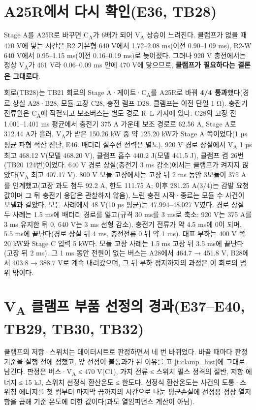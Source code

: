 \section{A25R에서 다시 확인(E36, TB28)}

Stage A를 A25R로 바꾸면 C\textsubscript{A}가 6배가 되어 V\textsubscript{A} 상승이 느려진다. 클램프가 없을 때 470 V에 닿는 시간은 R2 기본형 640 V에서 1.72–2.08 ms(이전 0.90–1.09 ms), R2-W 640 V에서 0.95–1.15 ms(이전 0.16–0.19 ms)로 늦어졌다. 그러나 920 V 충전에서는 정상 V\textsubscript{A}가 461 V라 0.06–0.09 ms 안에 470 V에 닿으므로, \textbf{클램프가 필요하다는 결론은 그대로다}.

회로(TB28)는 TB21 회로의 Stage A·게이트·C\textsubscript{A}를 A25R로 바꿔 \textbf{4/4 통과}했다(경로 상실 A28·B28, 모듈 고장 C28, 충전 램프 D28. 클램프는 이전 단일 1 Ω). 충전기 전류원은 C\textsubscript{A}에 직결되고 보조버스는 별도 경로 R–L 가지에 있다. C28의 고장 전 1.001–1.401 ms 평균에서 충전기 375 A 가운데 보조 경로로 62.56 A, Stage A로 312.44 A가 흘러, V\textsubscript{A}가 받은 150.26 kW 중 약 125.20 kW가 Stage A 쪽이었다(1 µs 평균 파형 적산 진단, E46. 배터리 실수전 전력은 별도). 920 V 경로 상실에서 V\textsubscript{A} 1 µs 최고 468.12 V(모델 468.20 V), 클램프 흡수 440.2 J(모델 441.5 J), 클램프 켬 26번(TB20 124번)이었다. 640 V 경로 상실(충전기 3 ms 감소)에서는 클램프가 켜지지 않았다(V\textsubscript{A} 최고 407.17 V). 800 V 모듈 고장에서는 고장 뒤 2 ms 동안 3모듈이 375 A를 인계했고(고장 과도 첨두 92.2 A, 한도 111.75 A; 이후 281.25 A(3/4)는 감발 요청값이며 그 뒤 충전기 응답은 관찰하지 않음), 느린 충전 시작·종료는 모듈 수 사건이 모델과 같았다. 모든 사례에서 48 V(10 µs 평균)는 47.994–48.027 V였다. 경로 상실 두 사례는 1.5 ms에 배터리 경로를 잃고(규격 30 ms를 3 ms로 축소: 920 V는 375 A를 3 ms 유지한 뒤 0, 640 V는 3 ms 선형 감소), 충전기 전류가 약 4.5 ms에 0이 되며, 5.5 ms에 끝난다(경로 상실 뒤 4 ms, 충전전류 0 뒤 약 1 ms). 대표 부하는 400 V 쪽 20 kW와 Stage C 입력 5 kW다. 모듈 고장 사례는 1.5 ms 고장 뒤 3.5 ms에 끝난다(고장 뒤 2 ms). 그 1 ms 동안 전원이 없는 버스는 A28에서 464.7 → 451.8 V, B28에서 403.8 → 388.7 V로 계속 내려갔으며, 그 뒤 부하 정지까지의 과정은 이 회로의 범위 밖이다.

\section{V\textsubscript{A} 클램프 부품 선정의 경과(E37–E40, TB29, TB30, TB32)}

클램프의 저항·스위치는 데이터시트로 판정하면서 네 번 바뀌었다. 바꿀 때마다 판정 기준을 실행 전에 정했고, 앞 선정이 불통과가 된 이유를 표 \ref{t:clamp_hist}에 그대로 남긴다. 판정은 버스·V\textsubscript{A} ≤ 470 V(C1), 가지 전류 ≤ 스위치 펄스 정격의 절반, 저항 에너지 ≤ 15 kJ, 스위치 선정식 환산온도 ≤ 한도다. 선정식 환산온도는 사건의 도통·스위칭 에너지를 첫 켬부터 마지막 끔까지의 시간으로 나눈 평균손실에 선정용 정상 열저항을 곱해 기준 온도에 더한 값이다(과도 열임피던스 계산이 아님).

